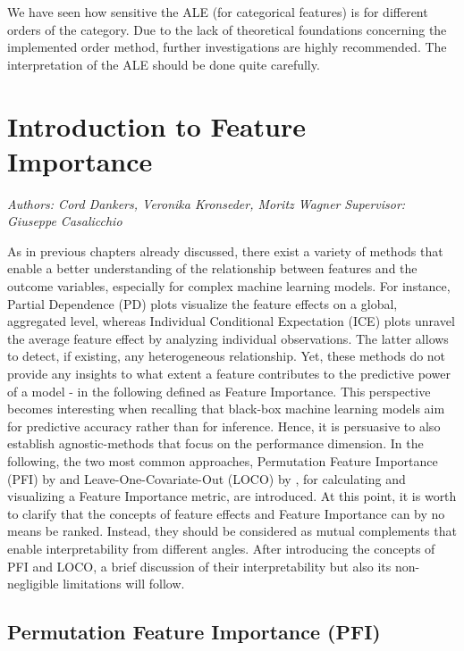 \documentclass[]{krantz}
\begin{document}
We have seen how sensitive the ALE (for categorical features) is for
different orders of the category. Due to the lack of theoretical
foundations concerning the implemented order method, further
investigations are highly recommended. The interpretation of the ALE
should be done quite carefully.

\chapter{Introduction to Feature Importance}\label{pfi}

\emph{Authors: Cord Dankers, Veronika Kronseder, Moritz Wagner}
\emph{Supervisor: Giuseppe Casalicchio}

As in previous chapters already discussed, there exist a variety of
methods that enable a better understanding of the relationship between
features and the outcome variables, especially for complex machine
learning models. For instance, Partial Dependence (PD) plots visualize
the feature effects on a global, aggregated level, whereas Individual
Conditional Expectation (ICE) plots unravel the average feature effect
by analyzing individual observations. The latter allows to detect, if
existing, any heterogeneous relationship. Yet, these methods do not
provide any insights to what extent a feature contributes to the
predictive power of a model - in the following defined as Feature
Importance. This perspective becomes interesting when recalling that
black-box machine learning models aim for predictive accuracy rather
than for inference. Hence, it is persuasive to also establish
agnostic-methods that focus on the performance dimension. In the
following, the two most common approaches, Permutation Feature
Importance (PFI) by \citet{breiman2001random} and
Leave-One-Covariate-Out (LOCO) by \citet{lei2018distribution}, for
calculating and visualizing a Feature Importance metric, are introduced.
At this point, it is worth to clarify that the concepts of feature
effects and Feature Importance can by no means be ranked. Instead, they
should be considered as mutual complements that enable interpretability
from different angles. After introducing the concepts of PFI and LOCO, a
brief discussion of their interpretability but also its non-negligible
limitations will follow.

\section{Permutation Feature Importance
(PFI)}\label{permutation-feature-importance-pfi}
\end{document}
